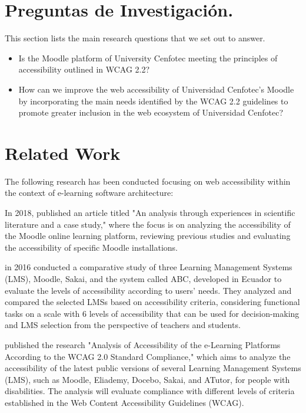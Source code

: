 \documentclass{IEEEtran}
\begin{document}
\section{Preguntas de Investigación.}
This section lists the main research questions that we set out to answer.
\begin{itemize}
    \item Is the Moodle platform of University Cenfotec meeting the principles of accessibility outlined in WCAG 2.2?
    \item How can we improve the web accessibility of Universidad Cenfotec's Moodle by incorporating the main needs identified by the WCAG 2.2 guidelines to promote greater inclusion in the web ecosystem of Universidad Cenfotec?
\end{itemize}


\section{Related Work}
The following research has been conducted focusing on web accessibility within the context of e-learning software architecture:

In 2018, \cite{Schiavone2018} published an article titled "An analysis through experiences in scientific literature and a case study," where the focus is on analyzing the accessibility of the Moodle online learning platform, reviewing previous studies and evaluating the accessibility of specific Moodle installations.

\cite{Acosta2016} in 2016 conducted a comparative study of three Learning Management Systems (LMS), Moodle, Sakai, and the system called ABC, developed in Ecuador to evaluate the levels of accessibility according to users' needs. They analyzed and compared the selected LMSs based on accessibility criteria, considering functional tasks on a scale with 6 levels of accessibility that can be used for decision-making and LMS selection from the perspective of teachers and students.

\cite{Bocevska2018} published the research "Analysis of Accessibility of the e-Learning Platforms According to the WCAG 2.0 Standard Compliance," which aims to analyze the accessibility of the latest public versions of several Learning Management Systems (LMS), such as Moodle, Eliademy, Docebo, Sakai, and ATutor, for people with disabilities. The analysis will evaluate compliance with different levels of criteria established in the Web Content Accessibility Guidelines (WCAG).
\end{document}
